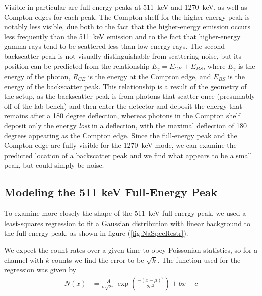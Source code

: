 \documentclass[letter]{article}
\begin{document}
 Visible in particular are full-energy peaks at \qty{511}{\kilo\electronvolt} and \qty{1270}{\kilo\electronvolt}, as well as Compton edges for each peak. The Compton shelf for the higher-energy peak is notably less visible, due both to the fact that the higher-energy emission occurs less frequently than the \qty{511}{\kilo\electronvolt} emission and to the fact that higher-energy gamma rays tend to be scattered less than low-energy rays. The second backscatter peak is not visually distinguishable from scattering noise, but its position can be predicted from the relationship $E_\gamma = E_{CE} + E_{BS}$, where $E_\gamma$ is the energy of the photon, $R_{CE}$ is the energy at the Compton edge, and $E_{BS}$ is the energy of the backscatter peak. This relationship is a result of the geometry of the setup, as the backscatter peak is from photons that scatter once (presumably off of the lab bench) and then enter the detector and deposit the energy that remains after a 180 degree deflection, whereas photons in the Compton shelf deposit only the energy \textit{lost} in a deflection, with the maximal deflection of 180 degrees appearing as the Compton edge. Since the full-energy peak and the Compton edge are fully visible for the \qty{1270}{\kilo\electronvolt} mode, we can examine the predicted location of a backscatter peak and we find what appears to be a small peak, but could simply be noise. 

\subsection{Modeling the 511 keV Full-Energy Peak}

To examine more closely the shape of the \qty{511}{\kilo\electronvolt} full-energy peak, we used a least-squares regression to fit a Gaussian distribution with linear background to the full-energy peak, as shown in figure (\ref{fig:NaSpecRestr}).


We expect the count rates over a given time to obey Poissonian statistics, so for a channel with $k$ counts we find the error to be $\sqrt{k}$. The function used for the regression was given by
\begin{align}
N(x)
&=
\frac{A}{\sigma \sqrt{2 \pi}} \exp \left( \frac{- (x-\mu)^2}{2 \sigma^2} \right) + bx + c
\end{align}
\end{document}
